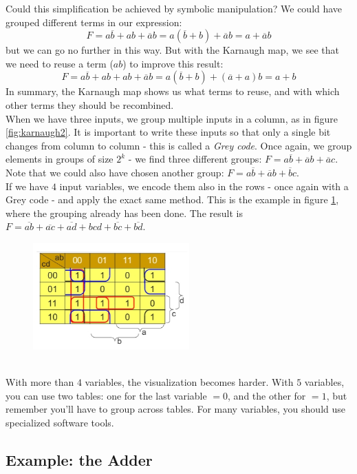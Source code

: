 Could this simplification be achieved by symbolic manipulation? We could have grouped different terms in our expression:
$$
F = a \overline{b} + a b + \overline{a}b = a (\overline{b} + b ) + \overline{a} b = a + \overline{a} b
$$
but we can go no further in this way. But with the Karnaugh map, we see that we need to reuse a term ($ab$) to improve this result:
$$
F = a \overline{b} + a b + a b + \overline{a}b = a (\overline{b} + b ) + (\overline{a} + a) b = a + b
$$
In summary, the Karnaugh map shows us what terms to reuse, and with which other terms they should be recombined.\\
When we have three inputs, we group multiple inputs in a column, as in figure \ref{fig:karnaugh2}. It is important to write these inputs so that only a single bit changes from column to column - this is called a \emph{Grey code}. Once again, we group elements in groups of size $2^k$ - we find three different groups: $F = a \overline{b} + \overline{a} b + \overline{a} c$. Note that we could also have chosen another group: $F = a \overline{b} + \overline{a} b + \overline{b} c$.\\
If we have $4$ input variables, we encode them also in the rows - once again with a Grey code - and apply the exact same method. This is the example in figure \ref{fig:karnaugh3}, where the grouping already has been done. The result is $F = \overline{ab} + \overline{ac} +  \overline{ad} + bcd + \overline{bc} + \overline{bd}$.
\begin{figure}[h!]
	\centering
	\includegraphics[width=6cm]{figures/ch13/karnaugh3.jpg}
	\caption{}
	\label{fig:karnaugh3}
\end{figure}
\\With more than $4$ variables, the visualization becomes harder. With $5$ variables, you can use two tables: one for the last variable $= 0$, and the other for $= 1$, but remember you'll have to group across tables. For many variables, you should use specialized software tools.

\subsection{Example: the Adder}

